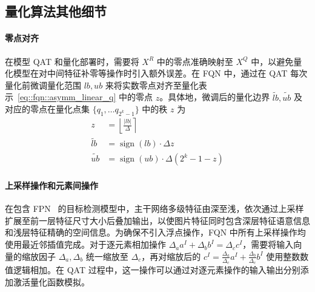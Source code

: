 \documentclass[
]{shtthesis}
\providecommand{\Round}[1]{\left\lfloor #1 \right\rceil}
\DeclareMathOperator{\sign}{sign}
\begin{document}
\subsection{量化算法其他细节} \label{sec::fqn::q_misc}
\paragraph{零点对齐}
在模型 QAT 和量化部署时，需要将 $X^R$ 中的零点准确映射至 $X^Q$ 中，以避免量化模型在对中间特征补零等操作时引入额外误差。在 FQN 中，通过在 QAT 每次量化前微调量化范围 $lb, ub$ 来将实数零点对齐至量化表示~\eqref{eq::fqn::asymm_linear_q} 中的零点 $z$。具体地，微调后的量化边界 $\tilde{lb}, \tilde{ub}$ 及对应的零点在量化点集 $\{q_1, \ldots q_{2^k-1}\}$ 中的秩 $z$ 为
\begin{align}
  z &= \Round{\frac{|lb|}{\Delta}} \\
  \tilde{lb} &= \sign(lb) \cdot \Delta z \\
  \tilde{ub} &= \sign(ub) \cdot \Delta (2^k - 1 - z)
\end{align}

\paragraph{上采样操作和元素间操作}
在包含 FPN~\citep{lin2017feature} 的目标检测模型中，主干网络多级特征由深至浅，依次通过上采样扩展至前一层特征尺寸大小后叠加输出，以使图片特征同时包含深层特征语意信息和浅层特征精确的空间信息。为确保不引入浮点操作，FQN 中所有上采样操作均使用最近邻插值完成。对于逐元素相加操作 $\Delta_a a^I + \Delta_b b^I = \Delta_c c^I$，需要将输入向量的缩放因子 $\Delta_a, \Delta_b$ 统一缩放至 $\Delta_c$，再对缩放后的 $c^I = \frac{\Delta_a}{\Delta_c}a^{I} + \frac{\Delta_b}{\Delta_c}b^{I}$ 使用整数数值逻辑相加。在 QAT 过程中，这一操作可以通过对逐元素操作的输入输出分别添加激活量化函数模拟。
\end{document}

